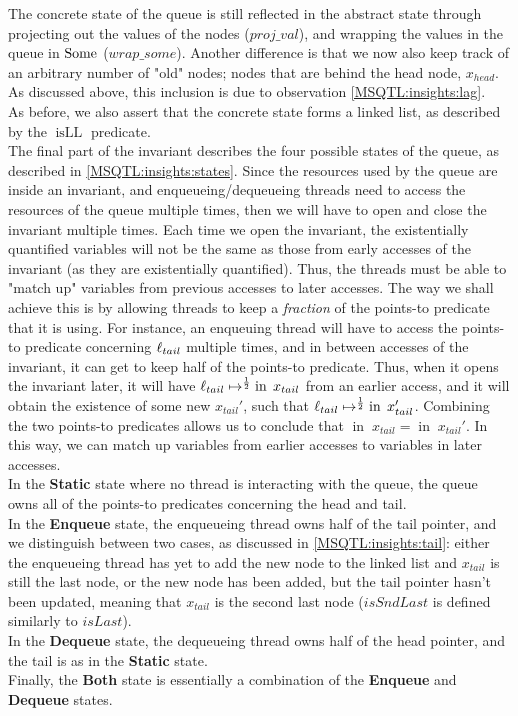 \documentclass[twoside,11pt,openright]{report}
\newcommand{\isLL}{\operatorname{isLL}}
\newcommand{\nIn}[1]{\operatorname{in} \; #1}
\newcommand{\StaticState}{\textbf{Static}}
\newcommand{\EnqueueState}{\textbf{Enqueue}}
\newcommand{\DequeueState}{\textbf{Dequeue}}
\newcommand{\BothState}{\textbf{Both}}
\begin{document}
The concrete state of the queue is still reflected in the abstract state through projecting out the values of the nodes ($proj\_val$), and wrapping the values in the queue in $\operatorname{Some}$ ($wrap\_some$). Another difference is that we now also keep track of an arbitrary number of "old" nodes; nodes that are behind the head node, $x_{head}$. As discussed above, this inclusion is due to observation \ref{MSQTL:insights:lag}.\\
As before, we also assert that the concrete state forms a linked list, as described by the $\isLL$ predicate.\\
The final part of the invariant describes the four possible states of the queue, as described in \ref{MSQTL:insights:states}. Since the resources used by the queue are inside an invariant, and enqueueing/dequeueing threads need to access the resources of the queue multiple times, then we will have to open and close the invariant multiple times. Each time we open the invariant, the existentially quantified variables will not be the same as those from early accesses of the invariant (as they are existentially quantified). Thus, the threads must be able to "match up" variables from previous accesses to later accesses. The way we shall achieve this is by allowing threads to keep a \textit{fraction} of the points-to predicate that it is using. For instance, an enqueuing thread will have to access the points-to predicate concerning $\ell_{tail}$ multiple times, and in between accesses of the invariant, it can get to keep half of the points-to predicate. Thus, when it opens the invariant later, it will have $\loc_{tail} \mapsto^{\frac{1}{2}} \nIn{x_{tail}}$ from an earlier access, and it will obtain the existence of some new $x_{tail}'$, such that $\loc_{tail} \mapsto^{\frac{1}{2}} \nIn{x_{tail}'}$. Combining the two points-to predicates allows us to conclude that $\nIn{x_{tail}} = \nIn{x_{tail}'}$. In this way, we can match up variables from earlier accesses to variables in later accesses.\\
In the \StaticState{} state where no thread is interacting with the queue, the queue owns all of the points-to predicates concerning the head and tail.\\
In the \EnqueueState{} state, the enqueueing thread owns half of the tail pointer, and we distinguish between two cases, as discussed in \ref{MSQTL:insights:tail}: either the enqueueing thread has yet to add the new node to the linked list and $x_{tail}$ is still the last node, or the new node has been added, but the tail pointer hasn't been updated, meaning that $x_{tail}$ is the second last node ($isSndLast$ is defined similarly to $isLast$).\\
In the \DequeueState{} state, the dequeueing thread owns half of the head pointer, and the tail is as in the \StaticState{} state.\\
Finally, the \BothState{} state is essentially a combination of the \EnqueueState{} and \DequeueState{} states.
\end{document}
